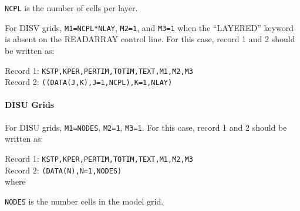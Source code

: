 \begin{description} \itemsep0pt \parskip0pt 
\item \texttt{NCPL} is the number of cells per layer.
\end{description}

\noindent For DISV grids, \texttt{M1=NCPL*NLAY}, \texttt{M2=1}, and \texttt{M3=1} when the ``LAYERED'' keyword is absent on the READARRAY control line. For this case, record 1 and 2 should be written as:

\vspace{5mm}
\noindent Record 1: \texttt{KSTP,KPER,PERTIM,TOTIM,TEXT,M1,M2,M3} \\
\noindent Record 2: \texttt{((DATA(J,K),J=1,NCPL),K=1,NLAY)} \\


\paragraph{DISU Grids}
For DISU grids, \texttt{M1=NODES}, \texttt{M2=1}, \texttt{M3=1}. For this case, record 1 and 2 should be written as:


\vspace{5mm}
\noindent Record 1: \texttt{KSTP,KPER,PERTIM,TOTIM,TEXT,M1,M2,M3} \\
\noindent Record 2: \texttt{(DATA(N),N=1,NODES)} \\

\vspace{5mm}
\noindent where

\begin{description} \itemsep0pt \parskip0pt 
\item \texttt{NODES} is the number cells in the model grid.
\end{description}
